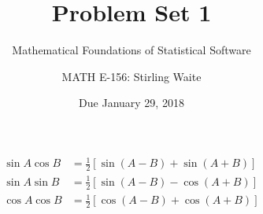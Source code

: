 \documentclass[12pt]{article}
\title{Problem Set 1}
\author{ Mathematical Foundations of Statistical Software}
\author{MATH E-156: Stirling Waite}
\date{Due January 29, 2018}
\begin{document}
          \begin{align*}
          \sin A \cos B &= \frac{1}{2}\left[ \sin(A-B)+\sin(A+B) \right] \\
          \sin A \sin B &= \frac{1}{2}\left[ \sin(A-B)-\cos(A+B) \right] \\
          \cos A \cos B &= \frac{1}{2}\left[ \cos(A-B)+\cos(A+B) \right] \\
          \end{align*}
       
\end{document}
